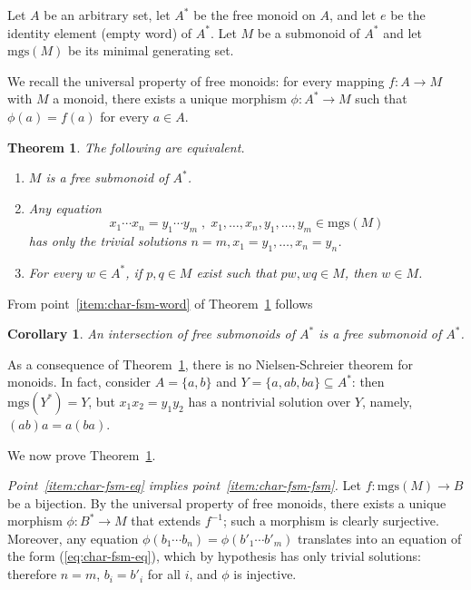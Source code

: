 \documentclass[12pt]{article}
\begin{document}
\newcommand{\mgs}{\ensuremath{\mathrm{mgs}}}

\newtheorem{definition}{Definition}
\newtheorem{theorem}{Theorem}
\newtheorem{corollary}{Corollary}

Let $A$ be an arbitrary set,
let $A^\ast$ be the free monoid on $A$,
and let $e$ be the identity element (empty word) of $A^\ast$.
Let $M$ be a submonoid of $A^\ast$
and let $\mgs(M)$ be its minimal generating set.

We recall the universal property of free monoids:
for every mapping $f:A\to M$ with $M$ a monoid,
there exists a unique morphism $\phi:A^\ast\to M$
such that $\phi(a)=f(a)$ for every $a\in A$.

\begin{theorem} \label{thm:char-fsm}
The following are equivalent.
\begin{enumerate}
\item \label{item:char-fsm-fsm}
$M$ is a free submonoid of $A^\ast$.
\item \label{item:char-fsm-eq}
Any equation
\begin{equation} \label{eq:char-fsm-eq}
x_1\cdots x_n=y_1\cdots y_m\;,\;
x_1,\ldots,x_n,y_1,\ldots,y_m\in\mgs(M)
\end{equation}
has only the trivial solutions $n=m,x_1=y_1,\ldots,x_n=y_n$.
\item \label{item:char-fsm-word}
For every $w\in A^\ast$,
if $p,q\in M$ exist such that $pw,wq\in M$,
then $w\in M$.
\end{enumerate}
\end{theorem}

From point~\ref{item:char-fsm-word} of Theorem~\ref{thm:char-fsm} follows

\begin{corollary} \label{cor:free-monoid-inters}
An intersection of free submonoids of $A^\ast$
is a free submonoid of $A^\ast$.
\end{corollary}

As a consequence of Theorem~\ref{thm:char-fsm},
there is no Nielsen-Schreier theorem for monoids.
In fact, consider $A=\{a,b\}$ and $Y=\{a,ab,ba\}\subseteq A^\ast$:
then $\mgs(Y^\ast)=Y$,
but $x_1x_2=y_1y_2$ has a nontrivial solution over $Y$,
namely, $(ab)a=a(ba)$.

We now prove Theorem~\ref{thm:char-fsm}.

\emph{Point~\ref{item:char-fsm-eq} implies point~\ref{item:char-fsm-fsm}.}
Let $f:\mgs(M)\to B$ be a bijection.
By the universal property of free monoids,
there exists a unique morphism $\phi:B^\ast\to M$ that extends $f^{-1}$;
such a morphism is clearly surjective.
Moreover, any equation $\phi(b_1\cdots b_n)=\phi(b'_1\cdots b'_m)$
translates into an equation of the form (\ref{eq:char-fsm-eq}),
which by hypothesis has only trivial solutions:
therefore $n=m$, $b_i=b'_i$ for all $i$, and $\phi$ is injective.
\end{document}
